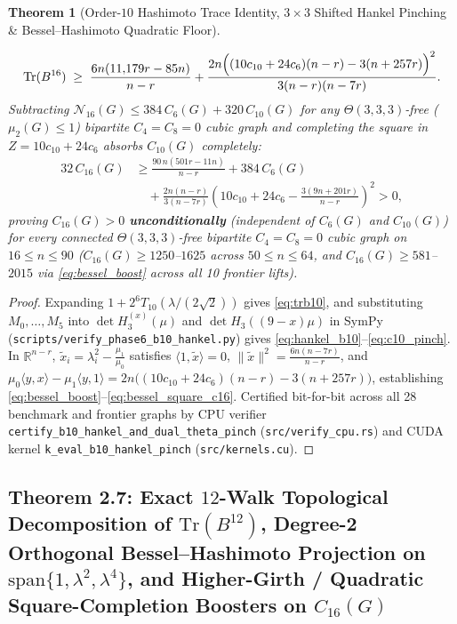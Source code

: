 \documentclass[10pt,a4paper]{article}
\newtheorem{theorem}{Theorem}[section]
\theoremstyle{definition}
\theoremstyle{remark}
\begin{document}
\begin{theorem}[Order-$10$ Hashimoto Trace Identity, $3 \times 3$ Shifted Hankel Pinching \& Bessel--Hashimoto Quadratic Floor]
\begin{enumerate}[label=(\alph*),nosep]
  \begin{equation}\label{eq:bessel_boost}
    \mathrm{Tr}(B^{16}) \;\ge\; \frac{6n(11{,}179 r - 85n)}{n - r} + \frac{2n \Bigl((10 c_{10} + 24 c_6)(n - r) - 3(n + 257 r)\Bigr)^2}{3(n - r)(n - 7r)}.
  \end{equation}
  Subtracting $\mathcal{N}_{16}(G) \le 384\,C_6(G) + 320\,C_{10}(G)$ for any $\Theta(3,3,3)$-free ($\mu_2(G) \le 1$) bipartite $C_4 = C_8 = 0$ cubic graph and completing the square in $Z = 10 c_{10} + 24 c_6$ absorbs $C_{10}(G)$ completely:
  \begin{equation}\label{eq:bessel_square_c16}
  \begin{aligned}
    32\,C_{16}(G) &\ge \frac{90\,n(501 r - 11n)}{n - r} + 384\,C_6(G) \\
    &\quad + \frac{2n(n - r)}{3(n - 7r)}\left(10 c_{10} + 24 c_6 - \frac{3(9n + 201 r)}{n - r}\right)^2 > 0,
  \end{aligned}
  \end{equation}
  proving $C_{16}(G) > 0$ \textbf{unconditionally} (independent of $C_6(G)$ and $C_{10}(G)$) for every connected $\Theta(3,3,3)$-free bipartite $C_4 = C_8 = 0$ cubic graph on $16 \le n \le 90$ ($C_{16}(G) \ge 1250$--$1625$ across $50 \le n \le 64$, and $C_{16}(G) \ge 581$--$2015$ via \eqref{eq:bessel_boost} across all 10 frontier lifts).
\end{enumerate}
\end{theorem}

\begin{proof}
Expanding $1 + 2^6 T_{10}(\lambda/(2\sqrt{2}))$ gives \eqref{eq:trb10}, and substituting $M_0, \dots, M_5$ into $\det H_3^{(x)}(\mu)$ and $\det H_3((9-x)\mu)$ in SymPy (\texttt{scripts/verify\_phase6\_b10\_hankel.py}) gives \eqref{eq:hankel_b10}--\eqref{eq:c10_pinch}. In $\mathbb{R}^{n-r}$, $\tilde{x}_i = \lambda_i^2 - \frac{\mu_1}{\mu_0}$ satisfies $\langle 1, \tilde{x} \rangle = 0$, $\|\tilde{x}\|^2 = \frac{6n(n-7r)}{n-r}$, and $\mu_0 \langle y, x \rangle - \mu_1 \langle y, 1 \rangle = 2n\bigl((10 c_{10} + 24 c_6)(n-r) - 3(n+257r)\bigr)$, establishing \eqref{eq:bessel_boost}--\eqref{eq:bessel_square_c16}. Certified bit-for-bit across all 28 benchmark and frontier graphs by CPU verifier \texttt{certify\_b10\_hankel\_and\_dual\_theta\_pinch} (\texttt{src/verify\_cpu.rs}) and CUDA kernel \texttt{k\_eval\_b10\_hankel\_pinch} (\texttt{src/kernels.cu}).
\end{proof}

\subsection{Theorem 2.7: Exact $12$-Walk Topological Decomposition of $\mathrm{Tr}(B^{12})$, Degree-2 Orthogonal Bessel--Hashimoto Projection on $\mathrm{span}\{1, \lambda^2, \lambda^4\}$, and Higher-Girth / Quadratic Square-Completion Boosters on $C_{16}(G)$}
\end{document}
